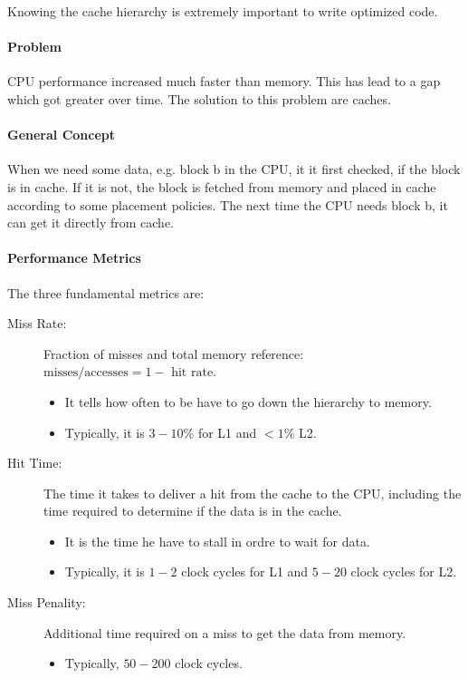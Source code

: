 

Knowing the cache hierarchy is extremely important to write optimized code.

\paragraph{Problem}
CPU performance increased much faster than memory. This has lead to a gap which got greater over time. The solution to this problem are caches.

\paragraph{General Concept}
When we need some data, e.g. block b in the CPU, it it first checked, if the block is in cache. If it is not, the block is fetched from memory and placed in cache according to some placement policies. The next time the CPU needs block b, it can get it directly from cache.

\paragraph{Performance Metrics}
The three fundamental metrics are:

\begin{description}
    \item[Miss Rate:] Fraction of misses and total memory reference: $\text{misses} / \text{accesses} = 1 - \text{ hit rate}$.
        \begin{itemize}
            \item It tells how often to be have to go down the hierarchy to memory.
            \item Typically, it is $3-10$\% for L1 and $< 1$\% L2.
        \end{itemize}
    \item[Hit Time:] The time it takes to deliver a hit from the cache to the CPU, including the time required to determine if the data is in the cache.
        \begin{itemize}
            \item It is the time he have to stall in ordre to wait for data.
            \item Typically, it is $1 - 2$ clock cycles for L1 and $5 - 20$ clock cycles for L2.
        \end{itemize}
    \item[Miss Penality:] Additional time required on a miss to get the data from memory.
        \begin{itemize}
            \item Typically, $50 - 200$ clock cycles.
        \end{itemize}
\end{description}


